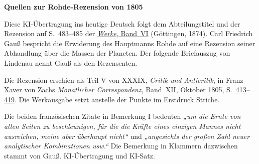 \clearpage\thispagestyle{empty}
\begin{center}\textbf{Quellen zur Rohde-Rezension von 1805}\end{center}
\noindent Diese KI-Übertragung ins heutige Deutsch folgt dem Abteilungstitel und der Rezension auf S.~483--485 der \href{https://gdz.sub.uni-goettingen.de/id/PPN236007467}{\textit{Werke}, Band~VI} (Göttingen, 1874). Carl Friedrich Gauß bespricht die Erwiderung des Hauptmanns Rohde auf eine Rezension seiner Abhandlung über die Massen der Planeten. Der folgende Briefauszug von Lindenau nennt Gauß als den Rezensenten.
\par\smallskip\noindent Die Rezension erschien als Teil V von XXXIX, \textit{Critik und Anticritik}, in Franz Xaver von Zachs \textit{Monatlicher Correspondenz}, Band~XII, Oktober 1805, S.~\href{https://api.digitale-sammlungen.de/iiif/image/v2/bsb10538604_00429/full/1500,/0/default.jpg}{413}--\href{https://api.digitale-sammlungen.de/iiif/image/v2/bsb10538604_00435/full/1500,/0/default.jpg}{419}. Die Werkausgabe setzt anstelle der Punkte im Erstdruck Striche.
\par\smallskip\noindent Die beiden französischen Zitate in Bemerkung I bedeuten \emph{„um die Ernte von allen Seiten zu beschleunigen, für die die Kräfte eines einzigen Mannes nicht ausreichen, meine aber überhaupt nicht“} und \emph{„angesichts der großen Zahl neuer analytischer Kombinationen usw.“} Die Bemerkung in Klammern dazwischen stammt von Gauß. KI-Übertragung und KI-Satz.
\clearpage
